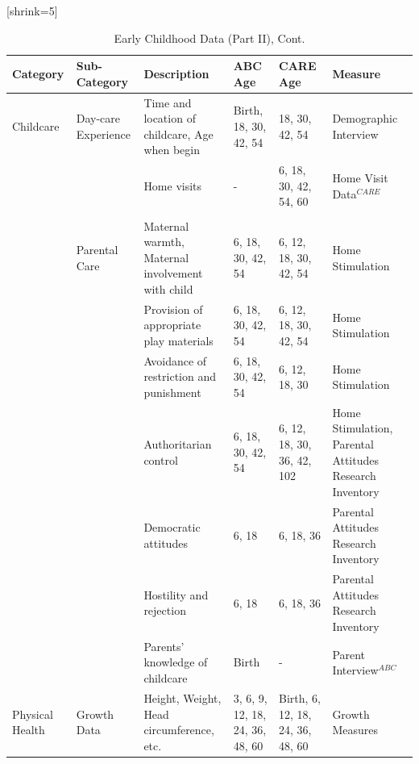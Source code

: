 \documentclass[static]{JJH-Beamer}
\begin{document}
\begin{frame}
 \addtocounter{framenumber}{-1}[shrink=5]

\begin{table}[H]
\addtocounter{table}{-1}
\caption{Early Childhood Data (Part II), Cont.}
\begin{center}
\begin{tiny}
\begin{tabular}{L{1.1cm} C{1.8cm} C{2.2cm} C{1.3cm} C{1.3cm}  C{2cm}}
\toprule
\textbf{Category}	&	\textbf{Sub-Category}	&	\textbf{Description}	&	\textbf{ABC Age}  	&  \textbf{CARE Age}  & 	\textbf{Measure}	\\ \midrule
Childcare	&	Day-care Experience	&	Time and location of childcare, Age when begin	&	Birth, 18, 30, 42, 54	&	18, 30, 42, 54	&	Demographic Interview	\\
			&						& 	Home visits &	-	&	6, 18, 30, 42, 54, 60	& Home Visit Data$^{CARE}$ \\
	&	\\
	&	Parental Care	&	Maternal warmth, Maternal involvement with child	&	6, 18, 30, 42, 54	&	6, 12, 18, 30, 42, 54	&	Home Stimulation	\\
	&		&	Provision of appropriate play materials	&	6, 18, 30, 42, 54	&	 6, 12, 18, 30, 42, 54	&	Home Stimulation	\\
	&		&	Avoidance of restriction and punishment	&	6, 18, 30, 42, 54	&	6, 12, 18, 30		&	Home Stimulation	\\
	&		&	Authoritarian control	&	6, 18, 30, 42, 54	&	6, 12, 18, 30, 36, 42, 102		&	Home Stimulation, Parental Attitudes Research Inventory	\\
	&		&	Democratic attitudes	&	6, 18	&	6, 18, 36	&	Parental Attitudes Research Inventory	\\
	&		&	Hostility and rejection	&	6, 18	&	6, 18, 36	&	Parental Attitudes Research Inventory	\\
	&		&	Parents' knowledge of childcare	&	Birth	&	-	&	Parent Interview$^{ABC}$	\\ \midrule
Physical Health	&	Growth Data	&	Height, Weight, Head circumference, etc.	&	3, 6, 9, 12, 18, 24, 36, 48, 60	&	Birth, 6, 12, 18, 24, 36, 48, 60	&	Growth Measures	\\
\bottomrule
\end{tabular}
\end{tiny}
\end{center}
\end{table}

\end{frame}
\end{document}
